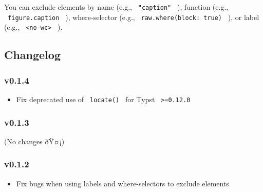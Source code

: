 You can exclude elements by name (e.g., \texttt{\ "caption"\ } ),
function (e.g., \texttt{\ figure.caption\ } ), where-selector (e.g.,
\texttt{\ raw.where(block:\ true)\ } ), or label (e.g.,
\texttt{\ \textless{}no-wc\textgreater{}\ } ).

\begin{Shaded}
\begin{Highlighting}[]



\NormalTok{\#word{-}count(total =\textgreater{} [}
\NormalTok{], exclude: \textless{}no{-}wc\textgreater{})}
\end{Highlighting}
\end{Shaded}

\subsection{Changelog}\label{changelog}

\subsubsection{v0.1.4}\label{v0.1.4}

\begin{itemize}
\tightlist
\item
  Fix deprecated use of \texttt{\ locate()\ } for Typst
  \texttt{\ \textgreater{}=0.12.0\ }
\end{itemize}

\subsubsection{v0.1.3}\label{v0.1.3}

(No changes ðŸ¤¡)

\subsubsection{v0.1.2}\label{v0.1.2}

\begin{itemize}
\tightlist
\item
  Fix bugs when using labels and where-selectors to exclude elements
\end{itemize}

